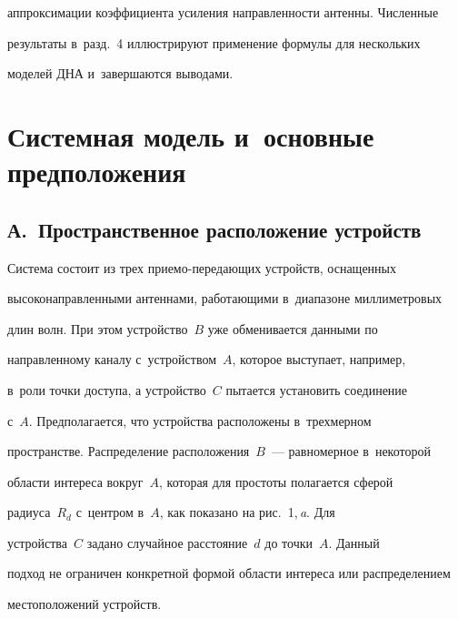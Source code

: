 аппроксимации коэффициента усиления направленности антенны. Численные 


результаты в~разд.~4 иллюстрируют применение формулы для нескольких 


моделей ДНА и~завершаются выводами.





\section{Системная модель и~основные предположения}





  \subsection*{А.~Пространственное расположение устройств}


  


  Система состоит из трех приемо-передающих устройств, оснащенных 


высоконаправленными антеннами, работающими в~диапазоне миллиметровых 


длин волн. При этом устройство~$B$ уже обменивается данными по 


направленному каналу с~устройством~$A$, которое выступает, например, 


в~роли точки доступа, а устройство~$C$ пытается установить соединение 


с~$A$. Предполагается, что устройства расположены в~трехмерном 


пространстве. Распределение расположения~$B$~--- равномерное в~некоторой 


области интереса вокруг~$A$, которая для простоты полагается сферой 


радиуса~$R_d$ с~центром в~$A$, как показано на рис.~1,\,\textit{a}. Для 


устройства~$C$ задано случайное расстояние~$d$ до точки~$A$. Данный 


подход не ограничен конкретной формой области интереса или распределением 


местоположений устройств.








